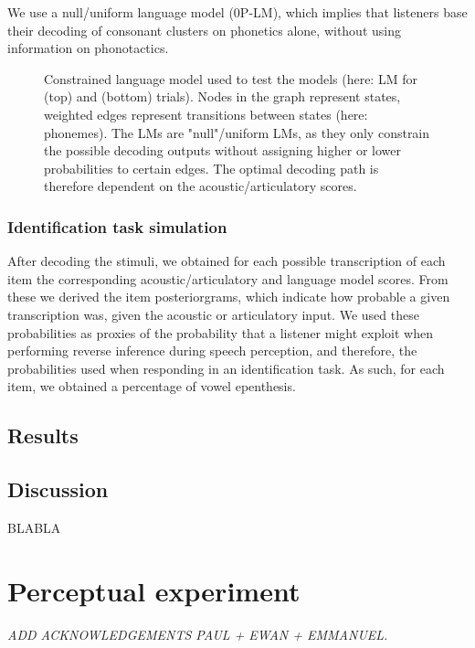 We use a null/uniform language model (\textsc{0P-LM}), which implies that listeners base their decoding of consonant clusters on phonetics alone, without using information on phonotactics.

\begin{figure*}[htb]
\centering
\vspace{0.5cm}
\caption{Constrained language model used to test the models (here: LM for  (top) and  (bottom) trials). Nodes in the graph represent states, weighted edges represent transitions between states (here: phonemes). The LMs are "null"/uniform LMs, as they only constrain the possible decoding outputs without assigning higher or lower probabilities to certain edges. The optimal decoding path is therefore dependent on the acoustic/articulatory scores.}
\label{fig:G_fst}
\end{figure*}

\subsubsection{Identification task simulation}
After decoding the stimuli, we obtained for each possible transcription of each item the corresponding acoustic/articulatory and language model scores. From these we derived the item posteriorgrams, which indicate how probable a given transcription was, given the acoustic or articulatory input. We used these probabilities as proxies of the probability that a listener might exploit when performing reverse inference during speech perception, and therefore, the probabilities used when responding in an identification task. As such, for each item, we obtained a percentage of vowel epenthesis.

\subsection{Results}
\subsection{Discussion}

BLABLA


\section{Perceptual experiment}
\small{\textit{{\color{red}ADD ACKNOWLEDGEMENTS PAUL + EWAN + EMMANUEL.\\}}}
